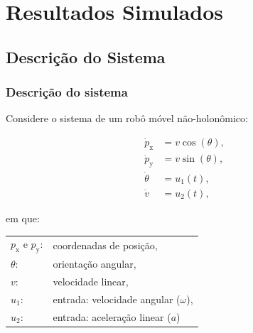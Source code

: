 \documentclass{beamer}
\renewcommand{\(}{\left(}
\renewcommand{\)}{\right)}
\renewcommand{\[}{\left[}
\renewcommand{\]}{\right]}
\begin{document}


\section{Resultados Simulados} 

\subsection{Descrição do Sistema} 


\begin{frame}
	\frametitle{Descrição do sistema}
	Considere o sistema de um robô móvel não-holonômico:

	\begin{minipage}{.70\textwidth}
		\begin{equation*}
					\begin{split}
		\dot{p}_{\textrm{x}} & = v\cos (\theta),\\
		\dot{p}_{\textrm{y}} & = v\sin (\theta),\\
		\dot{\theta}  & = u_1(t),\\
		\dot{v} & = u_2(t),
		\end{split}
		\end{equation*}
		
			
		em que:
		
		\vspace{0.2cm}
		
		\centering
		
		\begin{tabular}{l l}
			\hfill
			$p_{\textrm{x}}$ e $p_{\textrm{y}}$:	& coordenadas de posição, \\
			\hfill
			$\theta$:  							& orientação angular, \\
			\hfill
			$v$:								& velocidade linear, \\
			\hfill
			$u_1$:	 							& entrada: velocidade angular ($\omega$), \\
			\hfill
			$u_2$:	 							& entrada: aceleração linear ($a$)
		\end{tabular}
		

\end{minipage}
\end{frame}
\end{document}
